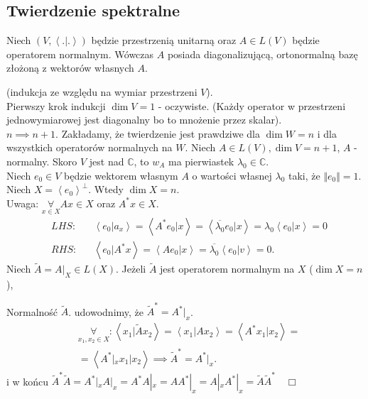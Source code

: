 \documentclass[../main.tex]{subfiles}
\begin{document}
\subsection{Twierdzenie spektralne}
\begin{tw}
    Niech $(V,\left<.|. \right>)$ będzie przestrzenią unitarną oraz $A\in L(V)$ będzie operatorem normalnym. Wówczas $A$ posiada diagonalizującą, ortonormalną bazę złożoną z wektorów własnych $A$.
\end{tw}
\begin{dowod}
    (indukcja ze względu na wymiar przestrzeni $V$).\\
    Pierwszy krok indukcji $\dim V = 1$ - oczywiste. (Każdy operator w przestrzeni jednowymiarowej jest diagonalny bo to mnożenie przez skalar).\\
    $n\implies n+1$. Zakładamy, że twierdzenie jest prawdziwe dla $\dim W = n$ i dla wszystkich operatorów normalnych na $W$. Niech $A\in L(V), \dim V = n+1$, $A$ - normalny. Skoro $V$ jest nad $\mathbb{C}$, to $w_A$ ma pierwiastek $\lambda_0\in\mathbb{C}$.\\
    Niech $e_0\in V$ będzie wektorem własnym $A$ o wartości własnej $\lambda_0$ taki, że $\Vert e_0 \Vert = 1$.\\
    Niech $X = \left<e_0 \right>^{\perp}$. Wtedy $\dim X = n$.\\
    Uwaga: $\underset{x\in X}{\forall} Ax\in X $ oraz $A^*x\in X$.
     \begin{align*}
         &LHS: &&\left<e_0|a_x \right> = \left<A^*e_0|x \right> = \left<\overline{\lambda_0}e_0|x \right> = \lambda_0 \left<e_0|x \right> = 0\\
         &RHS: &&\left<e_0|A^*x \right> = \left<Ae_0|x \right> = \overline{\lambda_0} \left<e_0|v \right> = 0
    .\end{align*}
    Niech $\tilde A = A|_{X}\in L(X)$.
    Jeżeli $\tilde A$ jest operatorem normalnym na $X$ ($\dim X = n $ ),

    Normalność $\tilde A$. udowodnimy, że $\tilde A^* = A^*|_x$.\\
    \begin{align*}
        &\underset{x_1,x_2\in X}{\forall} : \left<x_1|\tilde Ax_2 \right> = \left<x_1 | A x_2 \right> = \left<A^* x_1 | x_2 \right> = \\
        &= \left<A^*|_x x_1|x_2 \right> \implies \tilde A^* = A^*|_x
    .\end{align*}
    i w końcu $\tilde A^* \tilde A = A^* |_x A|_x = A^* A|_x = AA^*|_x = A|_xA^*|_x = \tilde A \tilde A^* \quad\Box$
\end{dowod}
\end{document}
